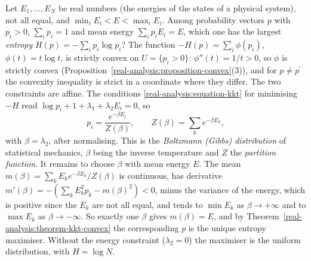 \begin{example}\label{real-analysis:example-gibbs}
Let $E_1, \ldots, E_N$ be real numbers (the energies of the states of a physical system), not all equal, and $\min_iE_i < E < \max_iE_i$. Among probability vectors $p$ with $p_i > 0$, $\sum_ip_i = 1$ and
mean energy $\sum_ip_iE_i = E$, which one has the largest \emph{entropy} $H(p) = -\sum_ip_i\log p_i$? The function $-H(p) = \sum_i\phi(p_i)$, $\phi(t) = t\log t$, is strictly convex on
$U = \{p_i > 0\}$: $\phi''(t) = 1/t > 0$, so $\phi$ is strictly convex (Proposition~\ref{real-analysis:proposition-convex}(3)), and for $p \neq p^{\prime}$ the convexity inequality is strict in a coordinate where
they differ. The two constraints are affine. The conditions
\eqref{real-analysis:equation-kkt} for minimising $-H$ read $\log p_i + 1 + \lambda_1 + \lambda_2E_i = 0$, so
\[
p_i = \frac{e^{-\beta E_i}}{Z(\beta)}, \qquad Z(\beta) = \sum_ke^{-\beta E_k},
\]
with $\beta = \lambda_2$, after normalising. This is the \emph{Boltzmann (Gibbs) distribution} of statistical mechanics, $\beta$ being the inverse temperature and $Z$ the \emph{partition function}.
It remains to choose $\beta$ with mean energy $E$. The mean $m(\beta) = \sum_kE_ke^{-\beta E_k}/Z(\beta)$ is continuous, has derivative $m'(\beta) = -(\sum_kE_k^2p_k - m(\beta)^2) < 0$, minus the
variance of the energy, which is positive since the $E_k$ are not all equal, and tends to $\min E_k$ as $\beta \to +\infty$ and to $\max E_k$ as $\beta \to -\infty$. So exactly one $\beta$ gives $m(\beta) = E$,
and by Theorem~\ref{real-analysis:theorem-kkt-convex} the corresponding $p$ is the unique entropy maximiser. Without the energy constraint ($\lambda_2 = 0$) the maximiser is the uniform
distribution, with $H = \log N$.
\end{example}

